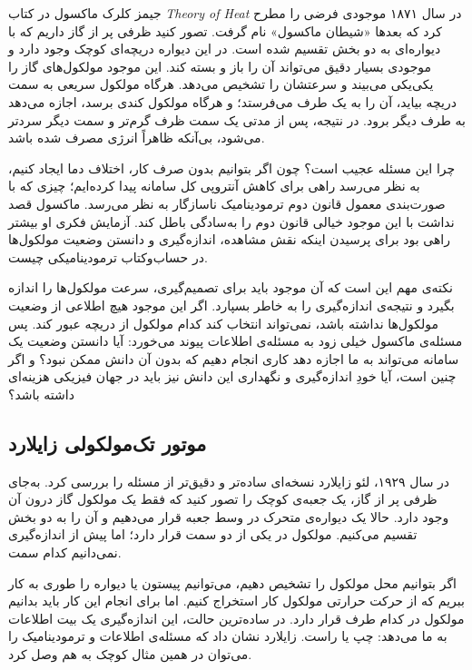 جیمز کلرک ماکسول در کتاب \textit{Theory of Heat} در سال ۱۸۷۱ موجودی فرضی را مطرح کرد که بعدها «شیطان ماکسول» نام گرفت. تصور کنید ظرفی پر از گاز داریم که با دیواره‌ای به دو بخش تقسیم شده است. در این دیواره دریچه‌ای کوچک وجود دارد و موجودی بسیار دقیق می‌تواند آن را باز و بسته کند. این موجود مولکول‌های گاز را یکی‌یکی می‌بیند و سرعتشان را تشخیص می‌دهد. هرگاه مولکول سریعی به سمت دریچه بیاید، آن را به یک طرف می‌فرستد؛ و هرگاه مولکول کندی برسد، اجازه می‌دهد به طرف دیگر برود. در نتیجه، پس از مدتی یک سمت ظرف گرم‌تر و سمت دیگر سردتر می‌شود، بی‌آنکه ظاهراً انرژی مصرف شده باشد.

چرا این مسئله عجیب است؟ چون اگر بتوانیم بدون صرف کار، اختلاف دما ایجاد کنیم، به نظر می‌رسد راهی برای کاهش آنتروپی کل سامانه پیدا کرده‌ایم؛ چیزی که با صورت‌بندی معمول قانون دوم ترمودینامیک ناسازگار به نظر می‌رسد. ماکسول قصد نداشت با این موجود خیالی قانون دوم را به‌سادگی باطل کند. آزمایش فکری او بیشتر راهی بود برای پرسیدن اینکه نقش مشاهده، اندازه‌گیری و دانستن وضعیت مولکول‌ها در حساب‌وکتاب ترمودینامیکی چیست. \autocite{maxwell1871}

نکته‌ی مهم این است که آن موجود باید برای تصمیم‌گیری، سرعت مولکول‌ها را اندازه بگیرد و نتیجه‌ی اندازه‌گیری را به خاطر بسپارد. اگر این موجود هیچ اطلاعی از وضعیت مولکول‌ها نداشته باشد، نمی‌تواند انتخاب کند کدام مولکول از دریچه عبور کند. پس مسئله‌ی ماکسول خیلی زود به مسئله‌ی اطلاعات پیوند می‌خورد: آیا دانستن وضعیت یک سامانه می‌تواند به ما اجازه دهد کاری انجام دهیم که بدون آن دانش ممکن نبود؟ و اگر چنین است، آیا خودِ اندازه‌گیری و نگهداری این دانش نیز باید در جهان فیزیکی هزینه‌ای داشته باشد؟

\subsection{موتور تک‌مولکولی زایلارد}
\label{sub:szilard-engine}

در سال ۱۹۲۹، لئو زایلارد نسخه‌ای ساده‌تر و دقیق‌تر از مسئله را بررسی کرد. به‌جای ظرفی پر از گاز، یک جعبه‌ی کوچک را تصور کنید که فقط یک مولکول گاز درون آن وجود دارد. حالا یک دیواره‌ی متحرک در وسط جعبه قرار می‌دهیم و آن را به دو بخش تقسیم می‌کنیم. مولکول در یکی از دو سمت قرار دارد؛ اما پیش از اندازه‌گیری نمی‌دانیم کدام سمت.

اگر بتوانیم محل مولکول را تشخیص دهیم، می‌توانیم پیستون یا دیواره را طوری به کار ببریم که از حرکت حرارتی مولکول کار استخراج کنیم. اما برای انجام این کار باید بدانیم مولکول در کدام طرف قرار دارد. در ساده‌ترین حالت، این اندازه‌گیری یک بیت اطلاعات به ما می‌دهد: چپ یا راست. زایلارد نشان داد که مسئله‌ی اطلاعات و ترمودینامیک را می‌توان در همین مثال کوچک به هم وصل کرد. \autocite{szilard1929}

